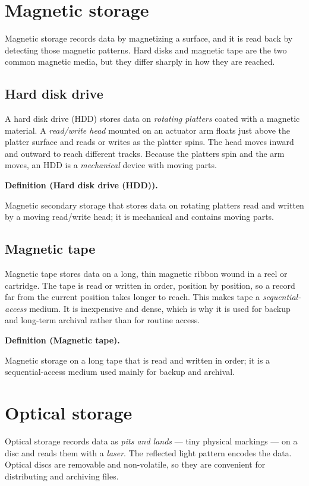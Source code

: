 \documentclass[11pt]{article}
\newenvironment{definitionbox}[1]{%
  \par\noindent\textbf{Definition (#1).}\ \itshape
}{\par\vspace{0.3em}}
\begin{document}
\section{Magnetic storage}
Magnetic storage records data by magnetizing a surface, and it is read back by
detecting those magnetic patterns. Hard disks and magnetic tape are the two
common magnetic media, but they differ sharply in how they are reached.

\subsection{Hard disk drive}
A hard disk drive (HDD) stores data on \emph{rotating platters} coated with a
magnetic material. A \emph{read/write head} mounted on an actuator arm floats
just above the platter surface and reads or writes as the platter spins. The
head moves inward and outward to reach different tracks. Because the platters
spin and the arm moves, an HDD is a \emph{mechanical} device with moving parts.

\begin{definitionbox}{Hard disk drive (HDD)}
Magnetic secondary storage that stores data on rotating platters read and
written by a moving read/write head; it is mechanical and contains moving
parts.
\end{definitionbox}

\subsection{Magnetic tape}
Magnetic tape stores data on a long, thin magnetic ribbon wound in a reel or
cartridge. The tape is read or written in order, position by position, so a
record far from the current position takes longer to reach. This makes tape a
\emph{sequential-access} medium. It is inexpensive and dense, which is why it
is used for backup and long-term archival rather than for routine access.

\begin{definitionbox}{Magnetic tape}
Magnetic storage on a long tape that is read and written in order; it is a
sequential-access medium used mainly for backup and archival.
\end{definitionbox}

\section{Optical storage}
Optical storage records data as \emph{pits and lands} --- tiny physical
markings --- on a disc and reads them with a \emph{laser}. The reflected light
pattern encodes the data. Optical discs are removable and non-volatile, so
they are convenient for distributing and archiving files.
\end{document}
